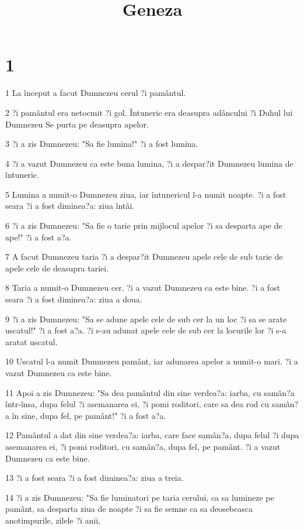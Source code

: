 

\title{Geneza}


\chapter{1}

\par 1 La început a facut Dumnezeu cerul ?i pamântul.
\par 2 ?i pamântul era netocmit ?i gol. Întuneric era deasupra adâncului ?i Duhul lui Dumnezeu Se purta pe deasupra apelor.
\par 3 ?i a zis Dumnezeu: "Sa fie lumina!" ?i a fost lumina.
\par 4 ?i a vazut Dumnezeu ca este buna lumina, ?i a despar?it Dumnezeu lumina de întuneric.
\par 5 Lumina a numit-o Dumnezeu ziua, iar întunericul l-a numit noapte. ?i a fost seara ?i a fost diminea?a: ziua întâi.
\par 6 ?i a zis Dumnezeu: "Sa fie o tarie prin mijlocul apelor ?i sa desparta ape de ape!" ?i a fost a?a.
\par 7 A facut Dumnezeu taria ?i a despar?it Dumnezeu apele cele de sub tarie de apele cele de deasupra tariei.
\par 8 Taria a numit-o Dumnezeu cer. ?i a vazut Dumnezeu ca este bine. ?i a fost seara ?i a fost diminea?a: ziua a doua.
\par 9 ?i a zis Dumnezeu: "Sa se adune apele cele de sub cer la un loc ?i sa se arate uscatul!" ?i a fost a?a. ?i s-au adunat apele cele de sub cer la locurile lor ?i s-a aratat uscatul.
\par 10 Uscatul l-a numit Dumnezeu pamânt, iar adunarea apelor a numit-o mari. ?i a vazut Dumnezeu ca este bine.
\par 11 Apoi a zis Dumnezeu: "Sa dea pamântul din sine verdea?a: iarba, cu samân?a într-însa, dupa felul ?i asemanarea ei, ?i pomi roditori, care sa dea rod cu samân?a în sine, dupa fel, pe pamânt!" ?i a fost a?a.
\par 12 Pamântul a dat din sine verdea?a: iarba, care face samân?a, dupa felul ?i dupa asemanarea ei, ?i pomi roditori, cu samân?a, dupa fel, pe pamânt. ?i a vazut Dumnezeu ca este bine.
\par 13 ?i a fost seara ?i a fost diminea?a: ziua a treia.
\par 14 ?i a zis Dumnezeu: "Sa fie luminatori pe taria cerului, ca sa lumineze pe pamânt, sa desparta ziua de noapte ?i sa fie semne ca sa deosebeasca anotimpurile, zilele ?i anii,
